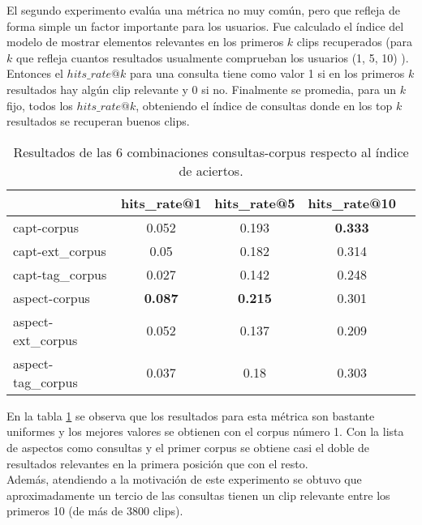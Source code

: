 El segundo experimento evalúa una métrica no muy común, pero que refleja de forma simple un factor importante para los usuarios. Fue calculado el índice del modelo de mostrar elementos relevantes en los primeros $k$ clips recuperados (para $k$ que refleja cuantos resultados usualmente comprueban los usuarios (1, 5, 10) ). \\
Entonces el \textit{$hits\_rate@k$} para una consulta tiene como valor 1 si en los primeros $k$ resultados hay algún clip relevante y 0 si no. Finalmente se promedia, para un $k$ fijo, todos los \textit{$hits\_rate@k$}, obteniendo el índice de consultas donde en los top $k$ resultados se recuperan buenos clips.

\begin{table}[h]
    \footnotesize
    \centering
    \begin{tabular} { | l | c | c | c | c | }
    \hline
                       &   hits\_rate@1   &   hits\_rate@5   &  hits\_rate@10 \\ 
    \hline
    capt-corpus        & 0.052           &  0.193          &  \textbf{0.333}  \\
    capt-ext\_corpus   & 0.05            &  0.182          &  0.314          \\ 
    capt-tag\_corpus   & 0.027           &  0.142          &  0.248          \\ 
    aspect-corpus      & \textbf{0.087}  &  \textbf{0.215} &  0.301          \\ 
    aspect-ext\_corpus & 0.052           &  0.137          &  0.209          \\ 
    aspect-tag\_corpus & 0.037           &  0.18           &  0.303          \\ 
    \hline
    \end{tabular}
    \caption{Resultados de las 6 combinaciones consultas-corpus	respecto al índice de aciertos.}
    \label{tab:hitsresults}
\end{table}

En la tabla \ref{tab:hitsresults} se observa que los resultados para esta métrica son bastante uniformes y los mejores valores se obtienen con el corpus número 1. Con la lista de aspectos como consultas y el primer corpus se obtiene casi el doble de resultados relevantes en la primera posición que con el resto. \\
Además, atendiendo a la motivación de este experimento se obtuvo que aproximadamente un tercio de las consultas tienen un clip relevante entre los primeros 10 (de más de 3800 clips). 


